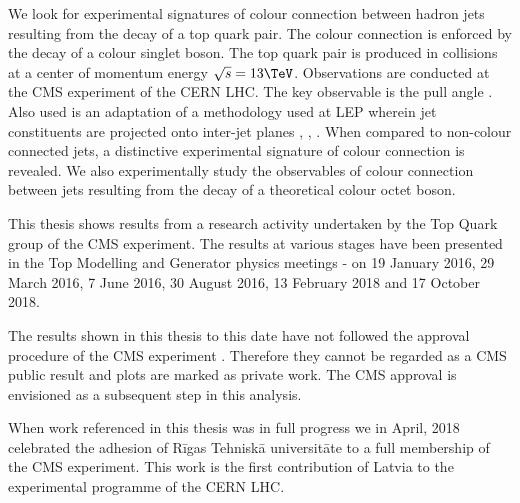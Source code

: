 We look for experimental signatures of colour connection between hadron jets resulting from the decay of a top quark pair. The colour connection is enforced by the decay of a colour singlet \PW boson. The top quark pair is produced in \Pp\Pp collisions at a center of momentum energy $\sqrt{s}=13\TeV$. Observations are conducted at the CMS experiment of the CERN LHC. The key observable is the pull angle \cite{Gallicchio:2010sw}. Also used is an adaptation of a methodology used at LEP wherein jet constituents are projected onto inter-jet planes \cite{Abbiendi:2005es}, \cite{Abdallah:2006uq}, \cite{Achard:2003pe}. When compared to non-colour connected jets, a distinctive experimental signature of colour connection is revealed. We also experimentally study the observables of colour connection between jets resulting from the decay of a theoretical colour octet \PW boson. 

This thesis shows results from a research activity undertaken by the Top Quark group of the CMS experiment. The results at various stages have been presented in the Top Modelling and Generator physics meetings - on 19 January 2016, 29 March 2016, 7 June 2016, 30 August 2016, 13 February 2018 and 17 October 2018.

The results shown in this thesis to this date have not followed the approval procedure of the CMS experiment \cite{twiki:PhysicsApprovals}. Therefore they cannot be regarded as a CMS public result and plots are marked as private work. The CMS approval is envisioned as a subsequent step in this analysis.

When work referenced in this thesis was in full progress we in April, 2018 celebrated the adhesion of Rīgas Tehniskā universitāte to a full membership of the CMS experiment. This work is the first contribution of Latvia to the experimental programme of the CERN LHC.
